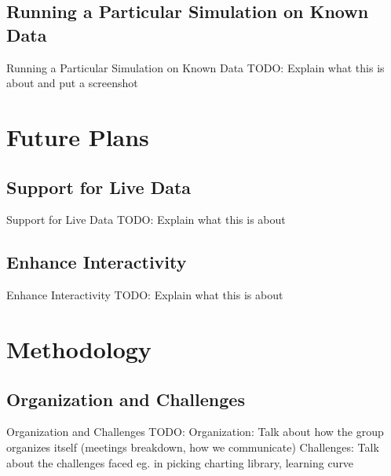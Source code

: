 \documentclass{beamer}
\begin{document}
\subsection{Running a Particular Simulation on Known Data}
\begin{frame}{Running a Particular Simulation on Known Data}
TODO: Explain what this is about and put a screenshot
\end{frame}

\section{Future Plans}

\subsection{Support for Live Data}
\begin{frame}{Support for Live Data}
TODO: Explain what this is about
\end{frame}

\subsection{Enhance Interactivity}
\begin{frame}{Enhance Interactivity}
TODO: Explain what this is about
\end{frame}

\section{Methodology}

\subsection{Organization and Challenges}
\begin{frame}{Organization and Challenges}
TODO: 
Organization: Talk about how the group organizes itself (meetings breakdown, how we communicate)
\newline Challenges: Talk about the challenges faced eg. in picking charting library, learning curve 
\end{frame}
\end{document}
